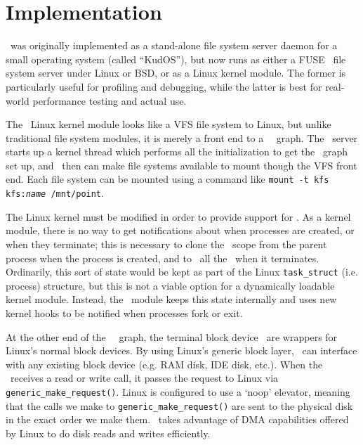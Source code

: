 \section{Implementation}
\label{sec:implementation}

\Kudos\ was originally implemented as a stand-alone file system server daemon
for a small operating system (called ``KudOS''), but now runs as either a
FUSE~\cite{fuse} file system server under Linux or BSD, or as a Linux kernel
module. The former is particularly useful for profiling and debugging, while the
latter is best for real-world performance testing and actual use. 


The \Kudos\ Linux kernel module looks like a VFS file system to Linux, but
unlike traditional file system modules,
it is merely a front end to a \Kudos\ \module\ graph. The \Kudos\
server starts up a kernel thread which performs all the initialization to get
the \module\ graph set up, and \modules\ then can make file systems available to
mount though the VFS front end. Each file system can be
mounted using a
command like \mbox{\texttt{mount -t kfs kfs:\textit{name} /mnt/point}}.

The Linux kernel must be modified in order to
provide support for \opgroups.  As a kernel module, there is no way to
get notifications about when processes are created, or when they terminate; this
is necessary to clone the \opgroup\ scope 
from the parent process when the process is created, and to \abandon\ all
the \opgroups\ when it terminates. Ordinarily, this sort of state would be kept
as part of the Linux \texttt{task\_struct} (i.e. process) structure, but this is
not a viable option for a dynamically loadable kernel module. Instead, the
\Kudos\ module keeps this state internally and uses new kernel hooks
to be notified when processes fork or exit. 

At the other end of the \Kudos\ \module\ graph, the terminal block device
\modules\ are wrappers for Linux's normal block devices. By using Linux's
generic block layer, \Kudos\ can interface with any existing block device (e.g.
RAM disk, IDE disk, etc.). When the \module\ receives a read or write call, it
passes the request to Linux via \texttt{generic\_make\_request()}. Linux is
configured to use a `noop' elevator, meaning that the calls we make to
\texttt{generic\_make\_request()} are sent to the physical disk in the exact
order we make them. \Kudos\ takes advantage of DMA capabilities offered by
Linux to do disk reads and writes efficiently.

